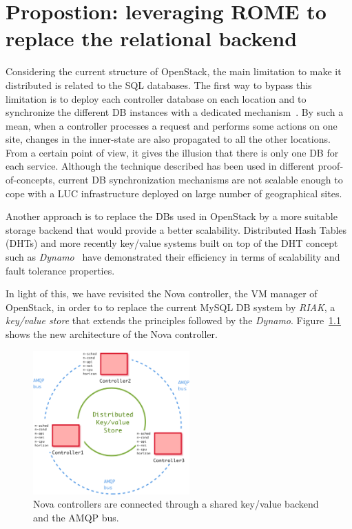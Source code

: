 \chapter{Propostion: leveraging ROME to replace the relational backend}
\label{sec:leveraging-rome}

Considering the current structure of OpenStack, the main limitation to make it
distributed is related to the SQL databases. The first way to bypass this
limitation is to deploy each controller database on each location and to
synchronize the different DB instances with a dedicated
mechanism~\cite{kemme:vldb2010}. By such a mean, when a controller processes a
request and performs some actions on one site, changes in the inner-state are
also propagated to all the other locations. From a certain point of view, it
gives the illusion that there is only one DB for each service. Although the
technique described has been used in different proof-of-concepts, current DB
synchronization mechanisms are not scalable enough to cope with a LUC
infrastructure deployed on large number of geographical sites.

Another approach is to replace the DBs used in OpenStack by a more suitable
storage backend that would provide a better scalability. Distributed Hash Tables
(DHTs) and more recently key/value systems built on top of the DHT concept such
as \emph{Dynamo}~\cite{decandia:dynamo} have demonstrated their efficiency in
terms of scalability and fault tolerance properties.

In light of this, we have revisited the Nova controller, \ie the VM manager of
OpenStack, in order to to replace the current MySQL DB system by
\textit{RIAK}\cite{riak}, a \textit{key/value store} that extends the principles
followed by the \textit{Dynamo}. Figure~\ref{fig:newnova} shows the new
architecture of the Nova controller.

\begin{figure}[h!]
        \centering
        \includegraphics[width=6cm]{figures/OpenStack_distributed.pdf}
        \caption{Nova controllers are connected through a shared key/value backend
        and the AMQP bus.}
      \label{fig:newnova}
\vspace*{-.3cm}
\end{figure}


